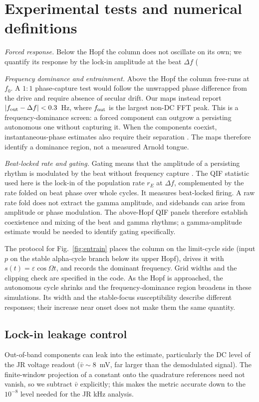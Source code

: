 \documentclass[11pt,a4paper]{article}
\newif\ifjne
\newif\ifsupp
\providecommand{\DIFaddtex}[1]{{\protect\color{blue} \sf #1}} %
\providecommand{\DIFadd}[1]{\texorpdfstring{\DIFaddtex{#1}}{#1}} %
\begin{document}
\section{\DIFadd{Experimental tests and numerical definitions}}\label{sec:vocab}
\DIFadd{\emph{Forced response.} Below the Hopf the column does not oscillate on its own;
we quantify its response by the lock-in amplitude at the beat $\Delta f$
(}\ifsupp \DIFadd{main-text}\fi{}

\DIFadd{\emph{Frequency dominance and entrainment.} Above the Hopf the column free-runs
at $f_0$. A $1{:}1$ phase-capture test would follow the unwrapped phase difference
from the drive and require absence of secular drift. Our maps instead report
$|f_{\rm out}-\Delta f|<0.3$~Hz, where $f_{\rm out}$ is the largest non-DC FFT
peak. This is a frequency-dominance screen: a forced component can outgrow a
persisting autonomous one without capturing it. When the components coexist,
instantaneous-phase estimates also require their separation
\cite{lachaux1999}. The maps therefore identify a dominance region, not a
measured Arnold tongue.
}

\DIFadd{\emph{Beat-locked rate and gating.} Gating means that the amplitude of a
persisting rhythm is modulated by the beat without frequency capture
\cite{canolty2010,tort2010}. The QIF statistic used here is the lock-in of the
population rate $r_E$ at $\Delta f$, complemented by the rate folded on beat
phase over whole cycles. It measures beat-locked firing. A raw rate fold does
not extract the gamma amplitude, and sidebands can arise from amplitude or phase
modulation. The above-Hopf QIF panels therefore establish coexistence and mixing
of the beat and gamma rhythms; a gamma-amplitude estimate would be needed to
identify gating specifically.
}

\DIFadd{The protocol for Fig.~\ref{fig:entrain} places the column on the limit-cycle side
(input $p$ on the stable alpha-cycle branch below its upper Hopf), drives it
with $s(t)=\varepsilon\cos\Omega t$, and records the dominant frequency. Grid
widths and the clipping check are specified in the code. As the Hopf is approached,
the autonomous cycle shrinks and the frequency-dominance region broadens in these
simulations. Its width and the stable-focus susceptibility describe different
responses; their increase near onset does not make them the same quantity.
}

\ifjne
\subsection{\DIFadd{Lock-in leakage control}}\label{supp:lockin}
\DIFadd{Out-of-band components can leak into the estimate, particularly the DC level of the JR voltage readout ($\bar v\!\sim\!8$~mV, far
larger than the demodulated signal). The finite-window projection of a constant onto the quadrature references
need not vanish, so we subtract $\bar v$ explicitly; this makes the metric
accurate down to the $10^{-8}$ level needed for the JR kHz
analysis.
}
\end{document}
